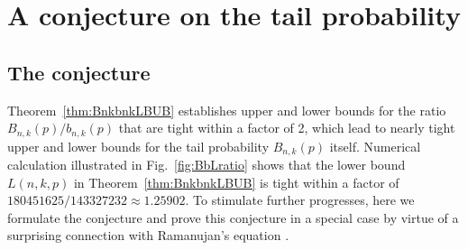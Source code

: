 \documentclass[aop]{imsart}
\theoremstyle{plain}
\theoremstyle{remark}
\newcommand{\1}{\operatorname{\uppercase\expandafter{\romannumeral1}}}
\newcommand{\2}{\operatorname{\uppercase\expandafter{\romannumeral2}}}
\newcommand{\3}{\operatorname{\uppercase\expandafter{\romannumeral3}}}
\newcommand{\4}{\operatorname{\uppercase\expandafter{\romannumeral4}}}
\newcommand{\5}{\operatorname{\uppercase\expandafter{\romannumeral5}}}
\newcommand{\6}{\operatorname{\uppercase\expandafter{\romannumeral6}}}
\newcommand{\7}{\operatorname{\uppercase\expandafter{\romannumeral7}}}
\newcommand{\8}{\operatorname{\uppercase\expandafter{\romannumeral8}}}
\newcommand{\9}{\operatorname{\uppercase\expandafter{\romannumeral9}}}
\newcommand{\fref}[1]{Fig.~\ref{#1}}
\newcommand{\thref}[1]{Theorem~\ref{#1}}
\newcommand{\Thref}[1]{Theorem~\ref{#1}}
\begin{document}
\bigskip
\section{A conjecture on the tail probability}\label{sec:conjecture}
\subsection{The conjecture}

\Thref{thm:BnkbnkLBUB} establishes  upper and lower bounds for the ratio $B_{n,k}(p)/b_{n,k}(p)$  that are tight within a factor of 2, which lead to nearly tight upper and lower bounds for the tail probability $B_{n,k}(p)$ itself. Numerical calculation illustrated in \fref{fig:BbLratio} shows that the lower bound $L(n,k,p)$ in \thref{thm:BnkbnkLBUB}  is tight within a factor of $180451625/143327232\approx 1.25902$. 
To stimulate further progresses, here we formulate the conjecture and prove this conjecture in a special case by virtue of a surprising connection with Ramanujan's equation \cite{Rama27,JogdS68}.
\end{document}
